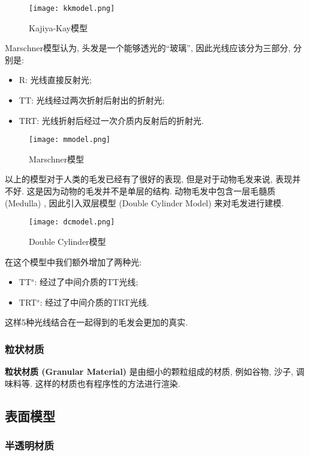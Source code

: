 \documentclass[openany]{progbookcn}
\begin{document}
\begin{figure}[H]
	\centering
	\texttt{[image: kkmodel.png]}
	\caption{Kajiya-Kay模型}
	\label{fig:kk}
\end{figure}

Marschner模型认为, 头发是一个能够透光的``玻璃”, 因此光线应该分为三部分, 分别是: 
\begin{itemize}
	\item R: 光线直接反射光; 
	\item TT: 光线经过两次折射后射出的折射光; 
	\item TRT: 光线折射后经过一次介质内反射后的折射光. 
\end{itemize}

\begin{figure}[H]
	\centering
	\texttt{[image: mmodel.png]}
	\caption{Marschner模型}
	\label{fig:mm}
\end{figure}

以上的模型对于人类的毛发已经有了很好的表现, 但是对于动物毛发来说, 表现并不好. 这是因为动物的毛发并不是单层的结构. 动物毛发中包含一层毛髓质 (Medulla) , 因此引入双层模型 (Double Cylinder Model) 来对毛发进行建模. 

\begin{figure}[H]
	\centering
	\texttt{[image: dcmodel.png]}
	\caption{Double Cylinder模型}
	\label{fig:dc}
\end{figure}

在这个模型中我们额外增加了两种光: 
\begin{itemize}
	\item TT$^s$: 经过了中间介质的TT光线; 
	\item TRT$^s$: 经过了中间介质的TRT光线. 
\end{itemize}

这样5种光线结合在一起得到的毛发会更加的真实. 

\subsubsection{粒状材质}

\textbf{粒状材质 (Granular Material) }是由细小的颗粒组成的材质, 例如谷物, 沙子, 调味料等. 这样的材质也有程序性的方法进行渲染. 

\subsection{表面模型}

\subsubsection{半透明材质}
\end{document}
